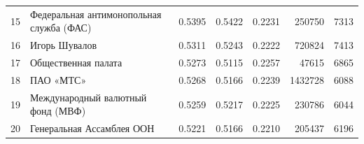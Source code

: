 \documentclass[11pt,a4paper]{article}
\begin{document}
\begin{table}[htbp]
\begin{tabular}{r l S[table-format=1.4] S[table-format=1.4] S[table-format=1.4] r r}
15 & Федеральная антимонопольная служба (ФАС) & 0.5395 & 0.5422 & 0.2231 & 250750 & 7313 \\
16 & Игорь Шувалов & 0.5311 & 0.5243 & 0.2222 & 720824 & 7413 \\
17 & Общественная палата & 0.5273 & 0.5115 & 0.2257 & 47615 & 6865 \\
18 & ПАО «МТС» & 0.5268 & 0.5166 & 0.2239 & 1432728 & 6088 \\
19 & Международный валютный фонд (МВФ) & 0.5259 & 0.5217 & 0.2225 & 230786 & 6044 \\
20 & Генеральная Ассамблея ООН & 0.5221 & 0.5166 & 0.2210 & 205437 & 6196 \\\bottomrule
\end{tabular}
\end{table}
\end{document}
